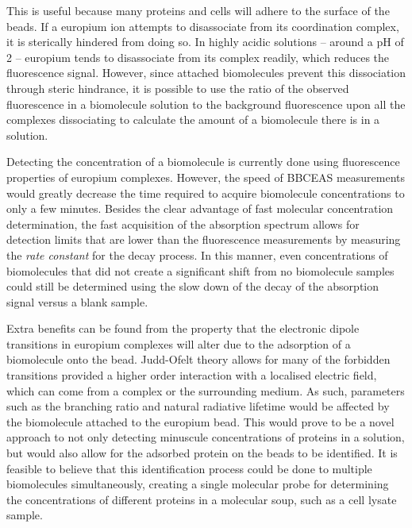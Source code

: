 This is useful because many proteins and cells will adhere to the surface of
the beads. If a europium ion attempts to disassociate from its coordination
complex, it is sterically hindered from doing so. In highly acidic solutions --
around a pH of 2 -- europium tends to disassociate from its complex readily,
which reduces the fluorescence signal. However, since attached biomolecules
prevent this dissociation through steric hindrance, it is possible to use the
ratio of the observed fluorescence in a biomolecule solution to the background
fluorescence upon all the complexes dissociating to calculate the amount of a
biomolecule there is in a solution.


Detecting the concentration of a biomolecule is currently done using
fluorescence properties of europium complexes. However, the speed of
\ac{BBCEAS} measurements would greatly decrease the time required to acquire
biomolecule concentrations to only a few minutes. Besides the clear advantage
of fast molecular concentration determination, the fast acquisition of the
absorption spectrum allows for detection limits that are lower than the
fluorescence measurements by measuring the \emph{rate constant} for the
decay process. In this manner, even concentrations of biomolecules that did
not create a significant shift from no biomolecule samples could still be
determined using the slow down of the decay of the absorption signal versus a
blank sample.

Extra benefits can be found from the property that the electronic dipole
transitions in europium complexes will alter due to the adsorption of a
biomolecule onto the bead. Judd-Ofelt theory allows for many of the forbidden
transitions provided a higher order interaction with a localised electric
field, which can come from a complex or the surrounding medium. As such,
parameters such as the branching ratio and natural radiative lifetime would be
affected by the biomolecule attached to the europium bead. This would prove to
be a novel approach to not only detecting minuscule concentrations of proteins
in a solution, but would also allow for the adsorbed protein on the beads to
be identified. It is feasible to believe that this identification process
could be done to multiple biomolecules simultaneously, creating a single
molecular probe for determining the concentrations of different proteins in a
molecular soup, such as a cell lysate sample.

